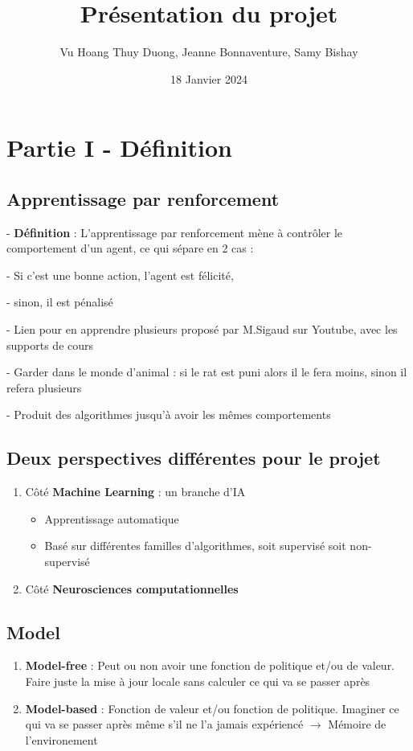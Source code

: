 \documentclass{article}
\title{Présentation du projet}
\author{Vu Hoang Thuy Duong, Jeanne Bonnaventure, Samy Bishay}
\date{18 Janvier 2024}
\begin{document}
\maketitle

\section{Partie I - Définition}
\subsection{Apprentissage par renforcement}
- \textbf{Définition} : L'apprentissage par renforcement mène à contrôler le comportement d'un agent, ce qui sépare en 2 cas : 

    - Si c'est une bonne action, l'agent est félicité,
    
    - sinon, il est pénalisé

- Lien pour en apprendre plusieurs proposé par M.Sigaud sur Youtube, avec les supports de cours

- Garder dans le monde d'animal : si le rat est puni alors il le fera moins, sinon il refera plusieurs

- Produit des algorithmes jusqu'à avoir les mêmes comportements

\subsection{Deux perspectives différentes pour le projet}
\begin{enumerate}
    \item Côté \textbf{Machine Learning} : un branche d'IA
    \begin{itemize}
        \item Apprentissage automatique
        \item Basé sur différentes familles d'algorithmes, soit supervisé soit non-supervisé
    \end{itemize}
    \item Côté \textbf{Neurosciences computationnelles}
\end{enumerate}

\subsection{Model}
\begin{enumerate}
    \item \textbf{Model-free} : Peut ou non avoir une fonction de politique et/ou de valeur. Faire juste la mise à jour locale sans calculer ce qui va se passer après
    \item \textbf{Model-based} : Fonction de valeur et/ou fonction de politique. Imaginer ce qui va se passer après même s'il ne l'a jamais expériencé $\rightarrow$ Mémoire de l'environement
\end{enumerate}
\end{document}
